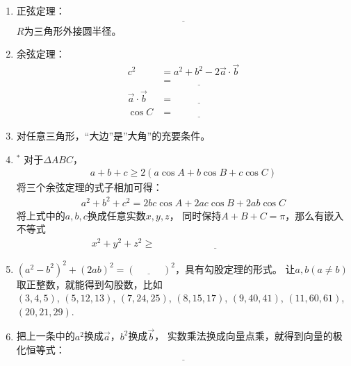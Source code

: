 \documentclass{article}
\newif\ifte
\renewcommand{\vec}{\overrightarrow}
\renewcommand\geq\geqslant
\begin{document}
\begin{multicols}{2}
\begin{enumerate}[leftmargin=20pt]
\item 正弦定理：
\begin{gather*}
    \underline{\ \ifte \dfrac{a}{\sin A}=\dfrac{b}{\sin B}=
        \dfrac{c}{\sin C} =2R \else \hspace{5cm} \fi\ }
\end{gather*}
$ R $为三角形外接圆半径。

\item 余弦定理：
\begin{align*}
    c^2 &=a^2+b^2-2\vec{a}\cdot\vec{b} \\
        &=\underline{\ \ifte a^2+b^2-2ab\cos C
          \else \hspace{2cm} \fi\ }  \\
    \vec{a}\cdot\vec{b} &=\underline{\ \ifte 
    \dfrac{a^2+b^2-c^2}{2} \else \hspace{2cm} \fi\ } \\
    \cos C &=\underline{\ \ifte 
        \dfrac{a^2+b^2-c^2}{2ab} \else \hspace{2cm} \fi\ }
\end{align*}

\item 对任意三角形，“大边”是”大角”的充要条件。

\item $^*$ 对于$ \Delta ABC $，
\begin{align*}
    a+b+c\geq 2(a\cos A+b\cos B+ c\cos C)
\end{align*}
将三个余弦定理的式子相加可得：
\begin{gather*}
    a^2+b^2+c^2=2bc\cos A+2ac\cos B+ 2ab\cos C
\end{gather*}
将上式中的$ a,b,c $换成任意实数$ x,y,z $，
同时保持$ A+B+C=\pi $，那么有嵌入不等式
\begin{align*}
    x^2+y^2+z^2 \geq \underline{\ \ifte 2yz\cos A+
    2zx\cos B + 2xy\cos C\else \hspace{5cm} \fi\ }
\end{align*}

\item $ (a^2-b^2)^2+(2ab)^2=(\underline{\ \ifte a^2+b^2
    \else \hspace{1cm} \fi\ })^2 $，具有勾股定理的形式。
让$ a,b (a\neq b) $取正整数，就能得到勾股数，比如 \\ 
$ (3,4,5) $, $ (5,12,13) $, $ (7,24,25) $, $ (8,15,17) $, 
$ (9,40,41) $, $ (11,60,61) $, $ (20,21,29) $.

\item 把上一条中的$ a^2 $换成$ \vec{a} $，$ b^2 $换成$ \vec{b} $，
实数乘法换成向量点乘，就得到向量的极化恒等式：
\begin{gather*}
    \underline{\ \ifte 4 \vec{a}\cdot \vec{b}=
    (\vec{a}+\vec{b})^2-(\vec{a}-\vec{b})^2\else \hspace{6cm} \fi\ }
\end{gather*}


\end{enumerate}
\end{multicols}
\end{document}
